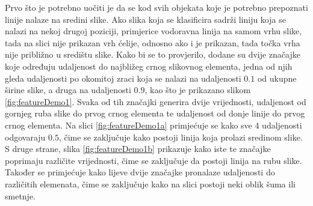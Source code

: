 \documentclass[times, utf8, zavrsni, numeric]{fer}
\begin{document}
Prvo što je potrebno uočiti je da se kod svih objekata koje je potrebno prepoznati linije nalaze na sredini slike.
Ako slika koja se klasificira sadrži liniju koja se nalazi na nekoj drugoj poziciji, primjerice vodoravna linija na samom vrhu slike, tada na slici nije prikazan vrh ćelije, odnosno ako i je prikazan, tada točka vrha nije približno u središtu slike.
Kako bi se to provjerilo, dodane su dvije značajke koje određuju udaljenost do najbližeg crnog slikovnog elementa, jedna od njih gleda udaljenosti po okomitoj zraci koja se nalazi na udaljenosti $0.1$ od ukupne širine slike, a druga na udaljenosti $0.9$, kao što je prikazano slikom \ref{fig:featureDemo1}.
Svaka od tih značajki generira dvije vrijednosti, udaljenost od gornjeg ruba slike do prvog crnog elementa te udaljenost od donje linije do prvog crnog elementa.
Na slici \ref{fig:featureDemo1a} primjećuje se kako sve $4$ udaljenosti odgovaraju $0.5$, čime se zaključuje kako postoji linija koja prolazi sredinom slike.
S druge strane, slika \ref{fig:featureDemo1b} prikazuje kako iste te značajke poprimaju različite vrijednosti, čime se zaključuje da postoji linija na rubu slike.
Također se primjećuje kako lijeve dvije značajke pronalaze udaljenosti do različitih elemenata, čime se zaključuje kako na slici postoji neki oblik šuma ili smetnje.\\
\end{document}
